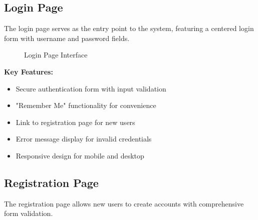 \subsection{Login Page}

The login page serves as the entry point to the system, featuring a centered login form with username and password fields.

\begin{figure}[h]
\centering
{}
\caption{Login Page Interface}
\label{fig:login}
\end{figure}

\textbf{Key Features:}
\begin{itemize}
    \item Secure authentication form with input validation
    \item "Remember Me" functionality for convenience
    \item Link to registration page for new users
    \item Error message display for invalid credentials
    \item Responsive design for mobile and desktop
\end{itemize}

\subsection{Registration Page}

The registration page allows new users to create accounts with comprehensive form validation.

